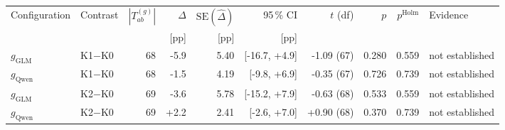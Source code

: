 \begin{tabular}{@{}llrrrrrrrl@{}}
  \toprule
  Configuration & Contrast & $|T^{(g)}_{ab}|$ & $\widehat\Delta$ & $\mathrm{SE}(\widehat\Delta)$ & 95\,\% CI & $t$ (df) & $p$ & $p^{\mathrm{Holm}}$ & Evidence \\
   & & & [pp] & [pp] & [pp] & & & & \\
  \midrule
  $g_{\mathrm{GLM}}$ & K1$-$K0 & 68 & -5.9 & 5.40 & [-16.7, +4.9] & -1.09 (67) & 0.280 & 0.559 & not established \\
  \rowcolor{black!6} $g_{\mathrm{Qwen}}$ & K1$-$K0 & 68 & -1.5 & 4.19 & [-9.8, +6.9] & -0.35 (67) & 0.726 & 0.739 & not established \\
  $g_{\mathrm{GLM}}$ & K2$-$K0 & 69 & -3.6 & 5.78 & [-15.2, +7.9] & -0.63 (68) & 0.533 & 0.559 & not established \\
  \rowcolor{black!6} $g_{\mathrm{Qwen}}$ & K2$-$K0 & 69 & +2.2 & 2.41 & [-2.6, +7.0] & +0.90 (68) & 0.370 & 0.739 & not established \\
  \bottomrule
\end{tabular}
